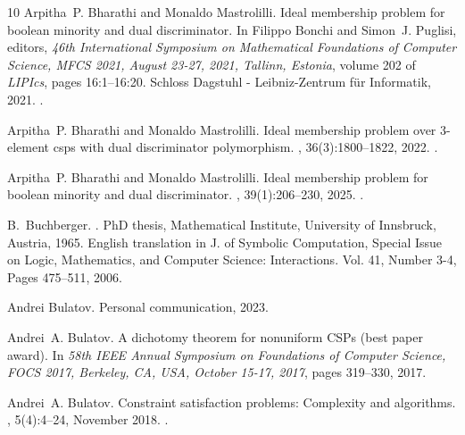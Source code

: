 \documentclass[11pt]{article}
\newcommand{\1}{\textbf{1}}
\begin{document}
\begin{thebibliography}{10}
Arpitha~P. Bharathi and Monaldo Mastrolilli.
\newblock Ideal membership problem for boolean minority and dual discriminator.
\newblock In Filippo Bonchi and Simon~J. Puglisi, editors, {\em 46th International Symposium on Mathematical Foundations of Computer Science, {MFCS} 2021, August 23-27, 2021, Tallinn, Estonia}, volume 202 of {\em LIPIcs}, pages 16:1--16:20. Schloss Dagstuhl - Leibniz-Zentrum f{\"{u}}r Informatik, 2021.
\newblock \href {https://doi.org/10.4230/LIPIcs.MFCS.2021.16} {}.

Arpitha~P. Bharathi and Monaldo Mastrolilli.
\newblock Ideal membership problem over 3-element csps with dual discriminator polymorphism.
, 36(3):1800--1822, 2022.
\newblock \href {https://doi.org/10.1137/21M1397131} {}.

Arpitha~P. Bharathi and Monaldo Mastrolilli.
\newblock Ideal membership problem for boolean minority and dual discriminator.
, 39(1):206--230, 2025.
\newblock \href {https://doi.org/10.1137/23M1556010} {}.

B.~Buchberger.
.
\newblock PhD thesis, Mathematical Institute, University of Innsbruck, Austria, 1965.
\newblock English translation in J. of Symbolic Computation, Special Issue on Logic, Mathematics, and Computer Science: Interactions. Vol. 41, Number 3-4, Pages 475--511, 2006.

Andrei Bulatov.
\newblock Personal communication, 2023.

Andrei~A. Bulatov.
\newblock A dichotomy theorem for nonuniform {CSP}s (best paper award).
\newblock In {\em 58th {IEEE} Annual Symposium on Foundations of Computer Science, {FOCS} 2017, Berkeley, CA, USA, October 15-17, 2017}, pages 319--330, 2017.

Andrei~A. Bulatov.
\newblock Constraint satisfaction problems: Complexity and algorithms.
, 5(4):4--24, November 2018.
\newblock \href {https://doi.org/10.1145/3292048.3292050} {}.


\end{thebibliography}
\end{document}
